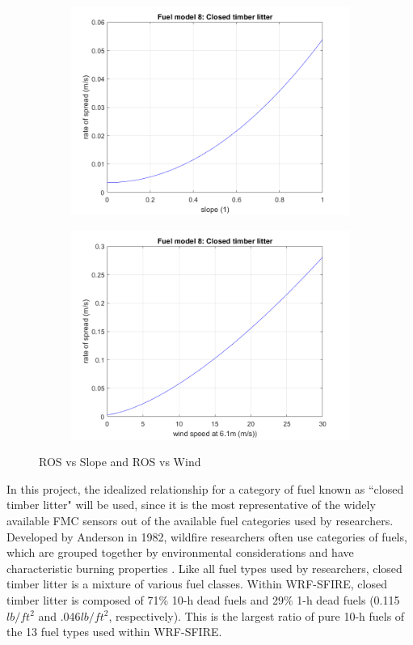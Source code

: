 \documentclass[11pt]{article}%
\begin{document}
\begin{figure}[ht]
    \centering
    \begin{subfigure}{0.45\textwidth}
        \centering
        \includegraphics[width=\linewidth]{images/fuel8_ros_slope.png}
    \end{subfigure}
    \hfill
    \begin{subfigure}{0.45\textwidth}
        \centering
        \includegraphics[width=\linewidth]{images/fuel8_ros_wind.png}
    \end{subfigure}
    \caption{ROS vs Slope and ROS vs Wind}
    \label{fig:ros_other}
\end{figure}

In this project, the idealized relationship for a category of fuel known as ``closed timber litter" will be used, since it is the most representative of the widely available FMC sensors out of the available fuel categories used by researchers. Developed by Anderson in 1982, wildfire researchers often use categories of fuels, which are grouped together by environmental considerations and have characteristic burning properties \citep{NIFC-2024-FAF}. Like all fuel types used by researchers, closed timber litter is a mixture of various fuel classes. Within WRF-SFIRE, closed timber litter is composed of 71\% 10-h dead fuels and 29\% 1-h dead fuels (0.115 $lb/ft^2$ and .046$lb/ft^2$, respectively). This is the largest ratio of pure 10-h fuels of the 13 fuel types used within WRF-SFIRE.
\end{document}
